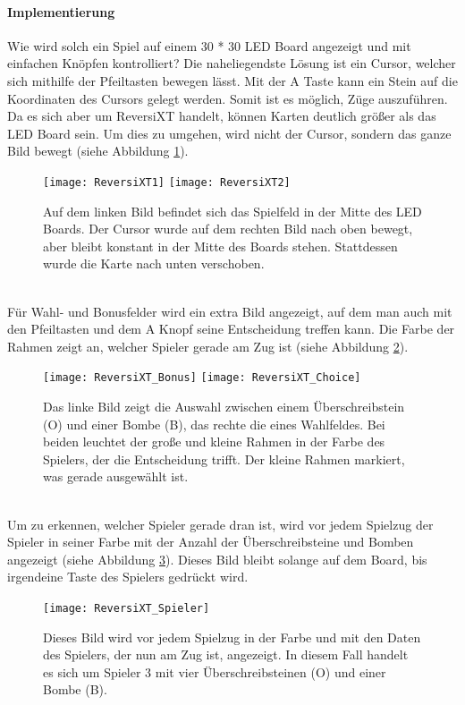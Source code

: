 \documentclass[12pt,a4paper]{article}
\begin{document}
\paragraph{Implementierung}
Wie wird solch ein Spiel auf einem 30 * 30 LED Board angezeigt und mit einfachen Knöpfen kontrolliert? Die naheliegendste Lösung ist ein Cursor, welcher sich mithilfe der Pfeiltasten bewegen lässt. Mit der A Taste kann ein Stein auf die Koordinaten des Cursors gelegt werden. Somit ist es möglich, Züge auszuführen. Da es sich aber um ReversiXT handelt, können Karten deutlich größer als das LED Board sein. Um dies zu umgehen, wird nicht der Cursor, sondern das ganze Bild bewegt (siehe Abbildung \ref{fig:ReversiXT}).
\begin{figure}[h]
\centering
\texttt{[image: ReversiXT1]}
\texttt{[image: ReversiXT2]}
\caption{\label{fig:ReversiXT}Auf dem linken Bild befindet sich das Spielfeld in der Mitte des LED Boards. Der Cursor wurde auf dem rechten Bild nach oben bewegt, aber bleibt konstant in der Mitte des Boards stehen. Stattdessen wurde die Karte nach unten verschoben.}
\end{figure}
\vspace{1ex}\\
Für Wahl- und Bonusfelder wird ein extra Bild angezeigt, auf dem man auch mit den Pfeiltasten und dem A Knopf seine Entscheidung treffen kann. Die Farbe der Rahmen zeigt an, welcher Spieler gerade am Zug ist (siehe Abbildung \ref{fig:ReversiXT_Sonderfeld}).
\begin{figure}[h]
\centering
\texttt{[image: ReversiXT\_Bonus]}
\texttt{[image: ReversiXT\_Choice]}
\caption{\label{fig:ReversiXT_Sonderfeld}Das linke Bild zeigt die Auswahl zwischen einem Überschreibstein (O) und einer Bombe (B), das rechte die eines Wahlfeldes. Bei beiden leuchtet der große und kleine Rahmen in der Farbe des Spielers, der die Entscheidung trifft. Der kleine Rahmen markiert, was gerade ausgewählt ist.}
\end{figure}
\vspace{1ex}\\
Um zu erkennen, welcher Spieler gerade dran ist, wird vor jedem Spielzug der Spieler in seiner Farbe mit der Anzahl der Überschreibsteine und Bomben angezeigt (siehe Abbildung \ref{fig:ReversiXT_Spieler}). Dieses Bild bleibt solange auf dem Board, bis irgendeine Taste des Spielers gedrückt wird.
\begin{figure}[h]
\centering
\texttt{[image: ReversiXT\_Spieler]}
\caption{\label{fig:ReversiXT_Spieler}Dieses Bild wird vor jedem Spielzug in der Farbe und mit den Daten des Spielers, der nun am Zug ist, angezeigt. In diesem Fall handelt es sich um Spieler 3 mit vier Überschreibsteinen (O) und einer Bombe (B).}
\end{figure}
\end{document}
